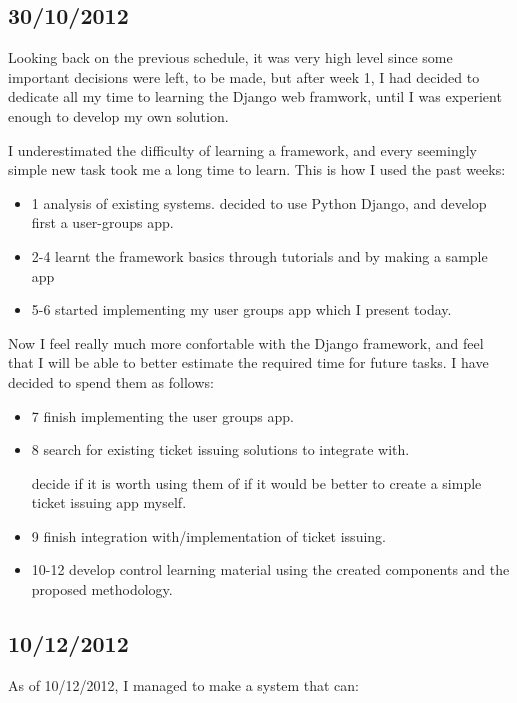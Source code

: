 \documentclass[12pt]{article}
\begin{document}
\subsection{30/10/2012}  \label{2012-10-30}

Looking back on the previous schedule, it was very high level since some important decisions were left,
to be made, but after week 1, I had decided to dedicate all my time to learning the Django web framwork,
until I was experient enough to develop my own solution.

I underestimated the difficulty of learning a framework, and every seemingly
simple new task took me a long time to learn. This is how I used the past weeks:

\begin{itemize}
  \item 1 analysis of existing systems. decided to use Python Django, and develop first a user-groups app.
  \item 2-4 learnt the framework basics through tutorials and by making a sample app
  \item 5-6 started implementing my user groups app which I present today.
\end{itemize}

Now I feel really much more confortable with the Django framework, and feel that I will be able to better
estimate the required time for future tasks. I have decided to spend them as follows:

\begin{itemize}
  \item 7 finish implementing the user groups app.
  \item 8 search for existing ticket issuing solutions to integrate with.
  
    decide if it is worth using them of if it would be better to create a simple ticket issuing app myself.
    
  \item 9 finish integration with/implementation of ticket issuing.
  \item 10-12 develop control learning material using the created components and the proposed methodology.
\end{itemize}

\subsection{10/12/2012} \label{2012-10-30}

As of 10/12/2012, I managed to make a system that can:
\end{document}
